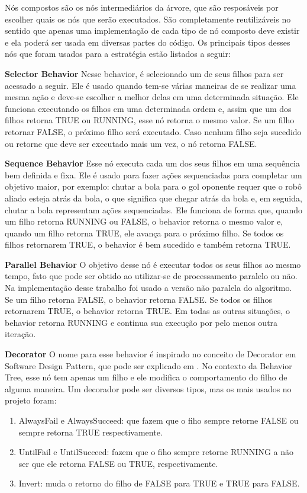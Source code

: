 \documentclass[a4paper,12pt]{article}
\begin{document}
Nós compostos são os nós intermediários da árvore, que  são resposáveis por escolher quais os nós que serão executados. São completamente reutilizáveis no sentido que apenas uma implementação de cada tipo de nó composto deve existir e ela poderá ser usada em diversas partes do código. Os principais tipos desses nós que foram usados para a estratégia estão listados a seguir:

\textbf{Selector Behavior} Nesse behavior, é selecionado um de seus filhos para ser acessado a seguir. Ele é usado quando tem-se várias maneiras de se realizar uma mesma ação e deve-se escolher a melhor delas em uma determinada situação. Ele funciona executando os filhos em uma determinada ordem e, assim que um dos filhos retorna TRUE ou RUNNING, esse nó retorna o mesmo valor. Se um filho retornar FALSE, o próximo filho será executado. Caso nenhum filho seja sucedido ou retorne que deve ser executado mais um vez, o nó retorna FALSE.

\textbf{Sequence Behavior} Esse nó executa cada um dos seus filhos em uma sequência bem definida e fixa. Ele é usado para fazer ações sequenciadas para completar um objetivo maior, por exemplo: chutar a bola para o gol oponente requer que o robô aliado esteja atrás da bola, o que significa que chegar atrás da bola e, em seguida, chutar a bola representam ações sequenciadas. Ele funciona de forma que, quando um filho retorna RUNNING ou FALSE, o behavior retorna o mesmo valor e, quando um filho retorna TRUE, ele avança para o próximo filho. Se todos os filhos retornarem TRUE, o behavior é bem sucedido e também retorna TRUE.

\textbf{Parallel Behavior} O objetivo desse nó é executar todos os seus filhos ao mesmo tempo, fato que pode ser obtido ao utilizar-se de processamento paralelo ou não. Na implementação desse trabalho foi usado a versão não paralela do algoritmo. Se um filho retorna FALSE, o behavior retorna FALSE. Se todos os filhos retornarem TRUE, o behavior retorna TRUE. Em todas as outras situações, o behavior retorna RUNNING e continua sua execução por pelo menos outra iteração.

\textbf{Decorator} O nome para esse behavior é inspirado no conceito de Decorator em Software Design Pattern, que pode ser explicado em \cite{hunt2013gang}. No contexto da Behavior Tree, esse nó tem apenas um filho e ele modifica o comportamento do filho de alguma maneira. Um decorador pode ser diversos tipos, mas os mais usados no projeto foram:

\begin{enumerate}
\item AlwaysFail e AlwaysSucceed: que fazem que o fiho sempre retorne FALSE ou sempre retorna TRUE respectivamente.
\item UntilFail e UntilSucceed: fazem que o fiho sempre retorne RUNNING a não ser que ele retorna FALSE ou TRUE, respectivamente.
\item Invert: muda o retorno do filho de FALSE para TRUE e TRUE para FALSE.
\end{enumerate}
\end{document}
